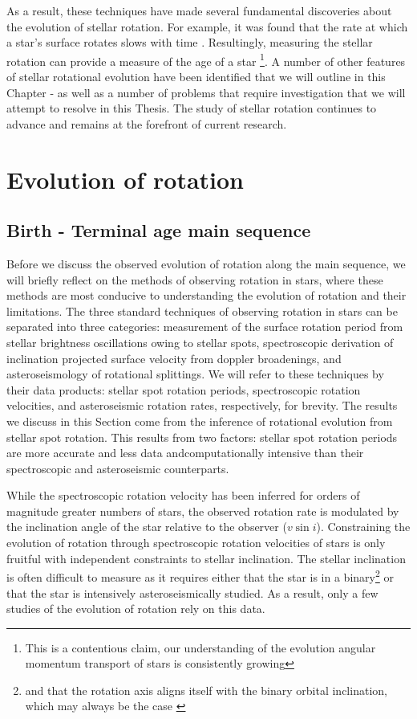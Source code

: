 As a result, these techniques have made several fundamental discoveries about the evolution of stellar rotation.
For example, it was found that the rate at which a star's surface rotates slows with time \citep{skumanich_time_1972}.
Resultingly, measuring the stellar rotation can provide a measure of the age of a star \footnote{This is a contentious claim, our understanding of the evolution angular momentum transport of stars is consistently growing}.
A number of other features of stellar rotational evolution have been identified that we will outline in this Chapter - as well as a number of problems that require investigation that we will attempt to resolve in this Thesis.
The study of stellar rotation continues to advance and remains at the forefront of current research.

\section{Evolution of rotation}
\label{sec:evolution}

\subsection{Birth - Terminal age main sequence}

Before we discuss the observed evolution of rotation along the main sequence, we will briefly reflect on the methods of observing rotation in stars, where these methods are most conducive to understanding the evolution of rotation and their limitations.
The three standard techniques of observing rotation in stars can be separated into three categories: measurement of the surface rotation period from stellar brightness oscillations owing to stellar spots, spectroscopic derivation of inclination projected surface velocity from doppler broadenings, and asteroseismology of rotational splittings.
We will refer to these techniques by their data products: stellar spot rotation periods, spectroscopic rotation velocities, and asteroseismic rotation rates, respectively, for brevity.
The results we discuss in this Section come from the inference of rotational evolution from stellar spot rotation.
This results from two factors: stellar spot rotation periods are more accurate and less data andcomputationally intensive than their spectroscopic and asteroseismic counterparts.

While the spectroscopic rotation velocity has been inferred for orders of magnitude greater numbers of stars, the observed rotation rate is modulated by the inclination angle of the star relative to the observer ($v\sin{i}$).
Constraining the evolution of rotation through spectroscopic rotation velocities of stars is only fruitful with independent constraints to stellar inclination.
The stellar inclination is often difficult to measure as it requires either that the star is in a binary\footnote{and that the rotation axis aligns itself with the binary orbital inclination, which may always be the case \cite{albrecht_banana_2011,albrecht_banana_2013}} or that the star is intensively asteroseismically studied.
As a result, only a few studies of the evolution of rotation rely on this data.

